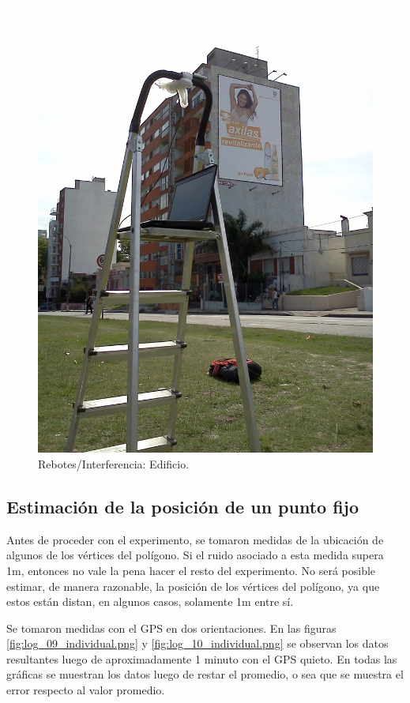 \documentclass[spanish,12pt,a4paper,titlepage]{report}
\begin{document}
\newpage
\begin{figure}[h!]
  \begin{center}
  \includegraphics[width=.9\textwidth]{./img/gps_interf1.jpg}
  \end{center}
  \caption{Rebotes/Interferencia: Edificio.}
  \label{fig:gps_interf1.jpg}
\end{figure}

\newpage
\subsection{Estimación de la posición de un punto fijo}
\label{sec:estimacion-de-la-posicion-de-un-punto-fijo}

Antes de proceder con el experimento, se tomaron medidas de la ubicación de algunos de los vértices del polígono. Si el ruido asociado a esta medida supera 1m, entonces no vale la pena hacer el resto del experimento. No será posible estimar, de manera razonable, la posición de los vértices del polígono, ya que estos están distan, en algunos casos, solamente 1m entre sí.

Se tomaron medidas con el GPS en dos orientaciones. En las figuras \ref{fig:log_09_individual.png} y \ref{fig:log_10_individual.png} se observan los datos resultantes luego de aproximadamente 1 minuto con el GPS quieto. En todas las gráficas se muestran los datos luego de restar el promedio, o sea que se muestra el error respecto al valor promedio.
\end{document}
